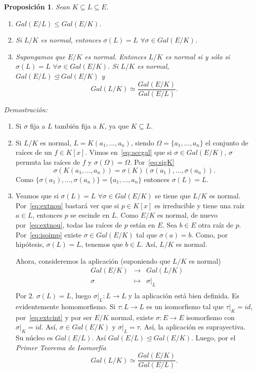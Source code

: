 \documentclass[12pt]{article}
\newtheorem{proposition}[theorem]{Proposición}
\begin{document}
\begin{proposition} Sean $K \subseteq L \subseteq E$. \begin{enumerate}
\item $Gal(E/L) \leq Gal(E/K)$.
\item Si $L/K$ es normal, entonces $\sigma (L) = L$ $\forall \sigma \in Gal(E/K)$.
\item Supongamos que $E/K$ es normal. Entonces $L/K$ es normal si y sólo si $\sigma (L) = L$ $\forall \sigma \in Gal(E/K)$. Si $L/K$ es normal, $Gal(E/L) \unlhd Gal(E/K)$ y $$Gal(L/K) \simeq \dfrac{Gal(E/K)}{Gal(E/L)}.$$
\end{enumerate}
\end{proposition}
\emph{Demostración: }\begin{enumerate}
\item Si $\sigma$ fija a $L$ también fija a $K$, ya que $K \subseteq L$.
\item Si $L/K$ es normal, $L = K(a_{1}, \ldots, a_{n})$, siendo $\Omega = \lbrace a_{1}, \ldots, a_{n} \rbrace $ el conjunto de raíces de un $f \in K[x]$. Vimos en~\ref{eq:accgal} que si $\sigma \in Gal(E/K)$, $\sigma$ permuta las raíces de $f$ y $\sigma(\Omega) = \Omega$. Por~\ref{eq:sigK} $$\sigma(K(a_{1}, \ldots, a_{n})) = \sigma(K)(\sigma(a_{1}), \ldots, \sigma(a_{n})).$$ Como $\lbrace \sigma(a_{1}), \ldots, \sigma(a_{n}) \rbrace = \lbrace a_{1}, \ldots, a_{n} \rbrace$ entonces $\sigma(L) = L$.
\item Veamos que si $\sigma(L) = L$ $\forall \sigma \in Gal(E/K)$ se tiene que $L/K$ es normal. Por~\ref{eq:extnou} bastará ver que si $p \in K[x]$ es irreducible y tiene una raíz $a \in L$, entonces $p$ se escinde en $L$. Como $E/K$ es normal, de nuevo por~\ref{eq:extnou}, todas las raíces de $p$ están en $E$. Sea $b \in E$ otra raíz de $p$. Por~\ref{eq:isoimp} existe $\sigma \in Gal(E/K)$ tal que $\sigma (a) = b$. Como, por hipótesis, $\sigma (L) = L$, tenemos que $b \in L$. Así, $L/K$ es normal.

Ahora, consideremos la aplicación (suponiendo que $L/K$ es normal) $$\begin{array}{rccl}
&Gal(E/K)&\longrightarrow &Gal(L/K) \\
&\sigma& \longmapsto &\left.\sigma \right|_L \\
\end{array}
$$
Por $2.$ $\sigma(L) = L$, luego $\left.\sigma \right|_L \colon L \longrightarrow L$ y la aplicación está bien definida. Es evidentemente homomorfismo. Si $\tau \colon L \longrightarrow L$ es un isomorfismo tal que $\left.\tau \right|_K=id$, por~\ref{eq:extcint} y por ser $E/K$ normal, existe $\sigma \colon E \longrightarrow E$ isomorfismo con $\left.\sigma \right|_K = id$. Así, $\sigma \in Gal (E/K)$ y $\left.\sigma \right|_L = \tau$. Así, la aplicación  es suprayectiva. Su núcleo es $Gal(E/L)$. Así $Gal(E/L) \unlhd Gal(E/K).$ Luego, por el \textit{Primer Teorema de Isomorfía} $$Gal(L/K) \simeq \dfrac{Gal(E/K)}{Gal(E/L)}.$$
\end{enumerate}
\end{document}
